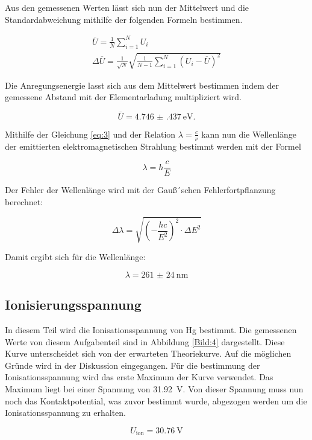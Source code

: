 Aus den gemessenen Werten lässt sich nun der Mittelwert und die Standardabweichung
mithilfe der folgenden Formeln bestimmen.

\begin{gather*}
  \overline{U} = \frac{1}{N} \sum^N_{i=1} U_i \\
  \Delta \overline{U} = \frac{1}{\sqrt{N}} \sqrt{\frac{1}{N-1} \sum^N_{i=1}(U_i-\overline{U})^2}
\end{gather*}

Die Anregungsenergie lasst sich aus dem Mittelwert bestimmen indem der gemessene Abstand
mit der Elementarladung multipliziert wird.

\begin{equation*}
  \overline{U} = \SI{4.746(437)}{\electronvolt}.
\end{equation*}

Mithilfe der Gleichung \ref{eq:3} und der Relation $\lambda = \frac{c}{\nu}$ kann
nun die Wellenlänge der emittierten elektromagnetischen Strahlung bestimmt werden
mit der Formel

\begin{equation*}
  \lambda = h \frac{c}{E}
\end{equation*}

Der Fehler der Wellenlänge wird mit der Gauß´schen Fehlerfortpflanzung berechnet:

\begin{equation*}
  \Delta \lambda = \sqrt{\left(-\frac{hc}{E^2}\right)^2 \cdot \Delta E^2}
\end{equation*}

Damit ergibt sich für die Wellenlänge:

\begin{equation*}
  \lambda = \SI{261(24)}{\nano\meter}
\end{equation*}

\subsection{Ionisierungsspannung}

In diesem Teil wird die Ionisationsspannung von Hg bestimmt. Die gemessenen Werte
von diesem Aufgabenteil sind in Abbildung \ref{Bild:4} dargestellt. Diese Kurve unterscheidet sich
von der erwarteten Theoriekurve. Auf die möglichen Gründe wird in der Diskussion eingegangen.
Für die bestimmung der Ionisationsspannung wird das erste Maximum der Kurve verwendet.
Das Maximum liegt bei einer Spannung von \SI{31.92}{\volt}. Von dieser Spannung muss nun noch
das Kontaktpotential, was zuvor bestimmt wurde, abgezogen werden um die Ionisationsspannung
zu erhalten.

\begin{equation*}
  U_\text{ion} = \SI{30.76}{\volt}
\end{equation*}
